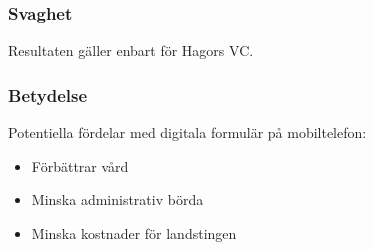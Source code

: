 \documentclass[english]{beamer}
\begin{document}
\begin{frame}
\frametitle{Svaghet}
Resultaten g{\"a}ller enbart f{\"o}r Hagors VC.
\end{frame}


\begin{frame}
\frametitle{Betydelse}
Potentiella f{\"o}rdelar med digitala formul{\"a}r p{\aa} mobiltelefon:
\begin{itemize}\vspace{-.33em}
\item F{\"o}rb{\"a}ttrar v{\aa}rd
\item Minska administrativ b{\"o}rda
\item Minska kostnader f{\"o}r landstingen
\end{itemize}
\end{frame}
\end{document}
